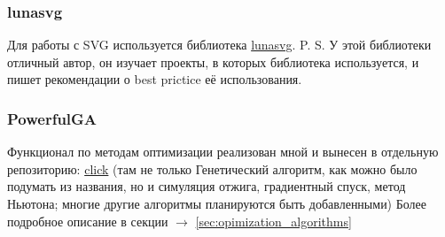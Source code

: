 \subsubsection{lunasvg}
Для работы с SVG используется библиотека \href{https://github.com/sammycage/lunasvg}{lunasvg}.
P. S. У этой библиотеки отличный автор, он изучает проекты, в которых библиотека используется, и пишет рекомендации о best prictice её использования.

\subsubsection{PowerfulGA}
Функционал по методам оптимизации реализован мной и вынесен в отдельную репозиторию: \href{https://github.com/donRumata03/PowerfulGA}{click}
(там не только Генетический алгоритм, как можно было подумать из названия, но и симуляция отжига, градиентный спуск, метод Ньютона;
многие другие алгоритмы планируются быть добавленными)
Более подробное описание в секции $\longrightarrow$ \ref{sec:opimization_algorithms}